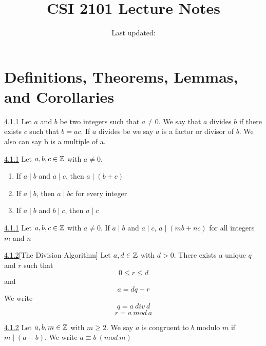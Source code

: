 \documentclass[openany]{report}
\title{CSI 2101 Lecture Notes}
\author{Last updated:}
\begin{document}
\maketitle

\tableofcontents
\chapter*{Definitions, Theorems, Lemmas, and Corollaries}
\label{chapter:theorems}
\begin{manualdefinition}{\hyperref[definition4.1.1]{4.1.1}}
    Let $a$ and $b$ be two integers such that $a \neq 0$. We say that $a$ divides $b$ if there exists $c$ such that $b = ac$. If $a$ divides be we say $a$ is a factor or divisor of $b$. We also can say b is a multiple of a.

\end{manualdefinition}
\begin{manualtheorem}{\hyperref[theorem4.1.1]{4.1.1}}
    Let $a,b,c \in \mathbb{Z}$ with $a \neq 0$.
    \begin{enumerate}
        \item If $a\mid b$ and $a \mid c$, then $a \mid (b + c)$
        \item If $a \mid b$, then $a \mid bc$ for every integer 
        \item If $a \mid b$ and $b \mid c$, then $a \mid c$
    \end{enumerate}
\end{manualtheorem}
\begin{manualcorollary}{\hyperref[corollary4.1.1]{4.1.1}}
Let $a,b,c \in \mathbb{Z}$ with $a \neq 0$. If $a\mid b$ and $a \mid c$, $a \mid (mb + nc)$ for all integers $m$ and $n$
\end{manualcorollary}
\begin{manualtheorem}{\hyperref[theorem4.1.2]{4.1.2}}[The Division Algorithm]
    Let $a, d \in \mathbb{Z}$ with $d > 0$. There exists a unique $q$ and $r$ such that 
$$0 \leq r \leq d$$
and 
$$a = dq + r$$
We write 
$$q = a \ div \ d$$
$$r=  a \ mod \ a $$
\end{manualtheorem}

\begin{manualdefinition}{\hyperref[definition4.1.2]{4.1.2}}
        Let $a, b, m \in \mathbb{Z}$ with $m \geq 2$. We say $a$ is congruent to $b$ modulo $m$ if $m \mid (a-b)$. We write $a \equiv b \ (mod \ m)$
\end{manualdefinition}
\end{document}
